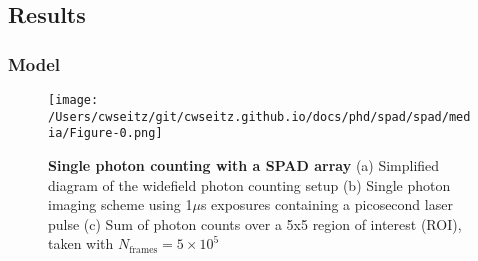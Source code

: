 


\subsection{Results}

\subsubsection{Model}

\begin{figure*}[t]
\centering
\texttt{[image: /Users/cwseitz/git/cwseitz.github.io/docs/phd/spad/spad/media/Figure-0.png]}
\caption{\textbf{Single photon counting with a SPAD array} (a) Simplified diagram of the widefield photon counting setup (b) Single photon imaging scheme using 1$\mu$s exposures containing a picosecond laser pulse (c) Sum of photon counts over a 5x5 region of interest (ROI), taken with $N_{\mathrm{frames}}=5\times 10^{5}$}
\label{fig:fig5}
\end{figure*}    

